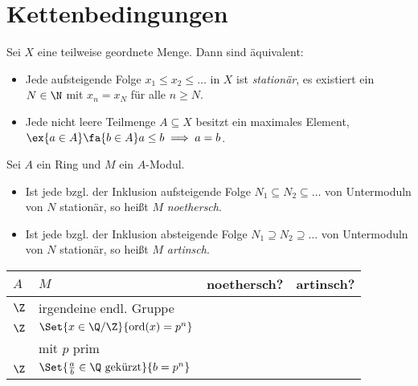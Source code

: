 \documentclass{cheat-sheet}
\newcommand{\cmark}{\ding{51}}
\newcommand{\xmark}{\ding{55}}
\DeclareMathOperator{\ord}{ord} %
\begin{document}
\section{Kettenbedingungen}



\begin{prop}
  Sei $X$ eine teilweise geordnete Menge.
  Dann sind äquivalent:
  \begin{itemize}
    \item Jede aufsteigende Folge $x_1 \leq x_2 \leq \ldots$ in $X$ ist \emph{stationär}, \dh{} es existiert ein $N \in \N$ mit $x_n = x_N$ für alle $n \geq N$.
    \item Jede nicht leere Teilmenge $A \subseteq X$ besitzt ein maximales Element, \dh{} $\ex{a \in A} \fa{b \in A} a \leq b \implies a = b$.
  \end{itemize}
\end{prop}

\begin{defn}
  Sei $A$ ein Ring und $M$ ein $A$-Modul.
  \begin{itemize}
    \item Ist jede bzgl. der Inklusion aufsteigende Folge $N_1 \subseteq N_2 \subseteq \ldots$ von Untermoduln von $N$ stationär, so heißt $M$ \emph{noethersch}.
    \item Ist jede bzgl. der Inklusion absteigende Folge $N_1 \supseteq N_2 \supseteq \ldots$ von Untermoduln von $N$ stationär, so heißt $M$ \emph{artinsch}.
  \end{itemize}
\end{defn}

\begin{bspe}
  \begin{minipage}[t]{0.88 \linewidth}
    \begin{tabular}[t]{l | l | l | l}
      $A$ & $M$ & noethersch? & artinsch? \\ \hline
      $\Z$ & irgendeine endl. Gruppe & \cmark & \cmark \\
      $\Z$ & $\Set{x \in \Q/\Z}{\ord(x) = p^n}$ & \xmark & \cmark \\
      & mit $p$ prim & & \\
      $\Z$ & $\Set{\tfrac{a}{b} \in \Q \text{ gekürzt}}{b = p^n}$ & \xmark & \xmark
    \end{tabular}
  \end{minipage}
\end{bspe}
\end{document}
